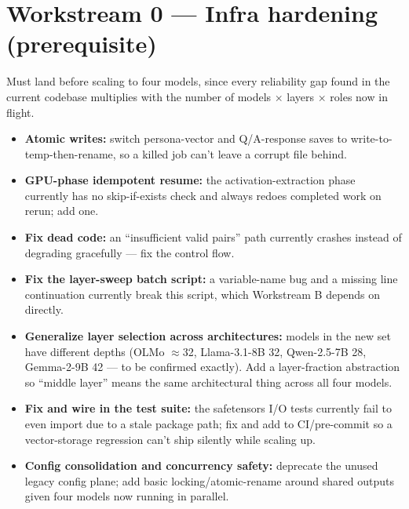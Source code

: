 \documentclass[11pt]{article}
\begin{document}
\section*{Workstream 0 --- Infra hardening (prerequisite)}
Must land before scaling to four models, since every reliability gap found in the current
codebase multiplies with the number of models $\times$ layers $\times$ roles now in flight.
\begin{itemize}
  \item \textbf{Atomic writes:} switch persona-vector and Q/A-response saves to
    write-to-temp-then-rename, so a killed job can't leave a corrupt file behind.
  \item \textbf{GPU-phase idempotent resume:} the activation-extraction phase currently has
    no skip-if-exists check and always redoes completed work on rerun; add one.
  \item \textbf{Fix dead code:} an ``insufficient valid pairs'' path currently crashes
    instead of degrading gracefully --- fix the control flow.
  \item \textbf{Fix the layer-sweep batch script:} a variable-name bug and a missing line
    continuation currently break this script, which Workstream B depends on directly.
  \item \textbf{Generalize layer selection across architectures:} models in the new set
    have different depths (OLMo $\approx$32, Llama-3.1-8B 32, Qwen-2.5-7B 28, Gemma-2-9B
    42 --- to be confirmed exactly). Add a layer-fraction abstraction so ``middle layer''
    means the same architectural thing across all four models.
  \item \textbf{Fix and wire in the test suite:} the safetensors I/O tests currently fail to
    even import due to a stale package path; fix and add to CI/pre-commit so a
    vector-storage regression can't ship silently while scaling up.
  \item \textbf{Config consolidation and concurrency safety:} deprecate the unused legacy
    config plane; add basic locking/atomic-rename around shared outputs given four models
    now running in parallel.
\end{itemize}
\end{document}
